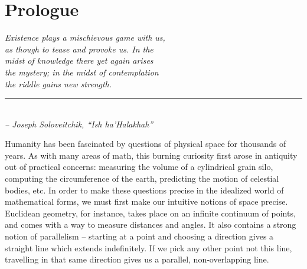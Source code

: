 \chapter*{Prologue}


\begin{flushleft}
	\textsl{Existence plays a mischievous game with us,}\\
	\textsl{as though to tease and provoke us. In the }\\
	\textsl{midst of knowledge there yet again arises }\\
	\textsl{the mystery; in the midst of contemplation}\\
	\textsl{the riddle gains new strength.}\\
	\rule[0pt]{19.5em}{0.5pt}\\
	\textsl{-- Joseph Soloveitchik, ``Ish ha'Halakhah''}
	\vspace{2em}
\end{flushleft}

Humanity has been fascinated by questions of physical space for thousands of years. As with many areas of math, this burning curiosity first arose in antiquity out of practical concerns: measuring the volume of a cylindrical grain silo, computing the circumference of the earth, predicting the motion of celestial bodies, etc. In order to make these questions precise in the idealized world of mathematical forms, we must first make our intuitive notions of space precise. 
Euclidean geometry, for instance, takes place on an infinite continuum of points, and comes with a way to measure distances and angles. It also contains a strong notion of parallelism -- starting at a point and choosing a direction gives a straight line which extends indefinitely. If we pick any other point not this line, travelling in that same direction gives us a parallel, non-overlapping line.


